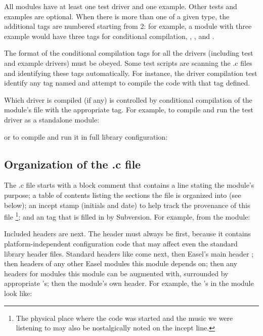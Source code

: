 All modules have at least one test driver and one example. Other tests
and examples are optional. When there is more than one 
of a given type, the additional tags are numbered starting from 2: for
example, a module with three example  would have three
tags for conditional compilation, ,
, and .

The format of the conditional compilation tags for all the drivers
(including test and example drivers) must be obeyed. Some test scripts
are scanning the .c files and identifying these tags
automatically. For instance, the driver compilation test identify any
tag named
and attempt to compile the code with that tag defined.

Which driver is compiled (if any) is controlled by conditional
compilation of the module's  file with the appropriate
tag. For example, to compile and run the  test driver as
a standalone module:

\begin{cchunk}
\end{cchunk}

or to compile and run it in full library configuration:

\begin{cchunk}
\end{cchunk}


\subsection{Organization of the .c file}

The .c file starts with a block comment that contains a line stating
the module's purpose; a table of contents listing the sections the
file is organized into (see below); an incept stamp (initials and
date) to help track the provenance of this file \footnote{The physical
place where the code was started and the music we were listening to
may also be nostalgically noted on the incept line.}; and an
 tag that is filled in by Subversion. For example,
from the  module:



Included headers are next. The  header must
always be first, because it contains platform-independent
configuration code that may affect even the standard library header
files. Standard headers like  come next, then Easel's
main header ; then headers of any other Easel modules
this module depends on; then any headers for modules this module can
be augmented with, surrounded by appropriate 's; then
the module's own header. For example, the 's in the
 module look like:

